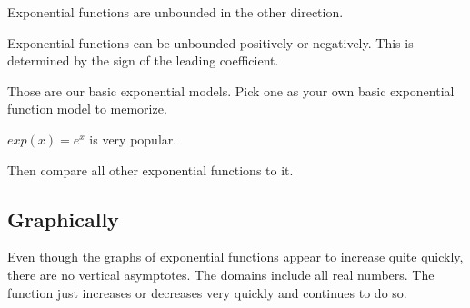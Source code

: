 \documentclass{ximera}
\begin{document}
Exponential functions are unbounded in the other direction. 


Exponential functions can be unbounded positively or negatively. This is determined by the sign of the leading coefficient. 




Those are our basic exponential models.  Pick one as your own basic exponential function model to memorize. 



$exp(x) = e^x$ is very popular. 


Then compare all other exponential functions to it.





















\subsection*{Graphically}

Even though the graphs of exponential functions appear to increase quite quickly, there are no vertical asymptotes.  The domains include all real numbers.  The function just increases or decreases very quickly and continues to do so.
\end{document}
